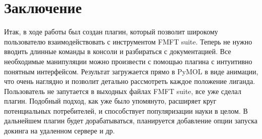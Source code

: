 \documentclass[a4paper,12pt]{article}
\numberwithin{equation}{section}%
\begin{document}
\section{Заключение}


Итак, в ходе работы был создан плагин, который позволит широкому пользователю взаимодействовать с инструментом FMFT suite. Теперь не нужно вводить длинные команды в консоли и разбираться с документацией. Все необходимые манипуляции можно произвести с помощью плагина с интуитивно понятным интерфейсом.
\newline
Результат загружается прямо в PyMOL в виде анимации, что очень наглядно и позволит детально рассмотреть каждое положение лиганда. Пользователь не запутается в выходных файлах FMFT suite, все уже сделал плагин.
\newline
Подобный подход, как уже было упомянуто, расширяет круг потенциальных потребителей, и способствует популяризации науки в целом.
\newline
В дальнейшем плагин будет дорабатываться, планируется добавление опции запуска докинга на удаленном сервере и др.
\newpage

\renewcommand{\refname}{Список литературы}
\end{document}
